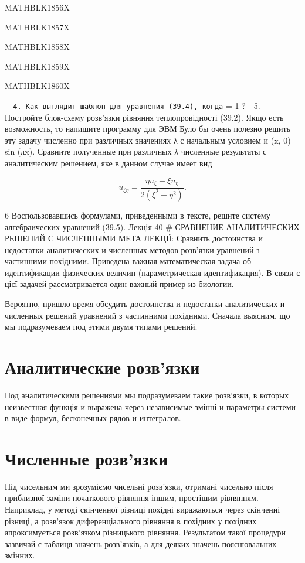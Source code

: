 \documentclass[
  ukrainian,
]{article}
\begin{document}
MATHBLK1856X

MATHBLK1857X

MATHBLK1858X

MATHBLK1859X

MATHBLK1860X

\texttt{-\ 4.\ Как\ выглядит\ шаблон\ для\ уравнения\ (39.4),\ когда}
\lambda = 1 ? - 5. Постройте блок-схему розв'язки рівняння
теплопровідності (39.2). Якщо есть возможность, то напишите программу
для ЭВМ Було бы очень полезно решить эту задачу численно при различных
значениях λ с начальным условием и (x, 0) = sin (πx). Сравните
полученные при различных λ численные результаты с аналитическим
решением, яке в данном случае имеет вид

\[
u_{\xi\eta} = \frac{\eta u_{\xi} - \xi u_{\eta}}{2(\xi^2 - \eta^2)}.
\]

6 Воспользовавшись формулами, приведенными в тексте, решите систему
алгебраических уравнений (39.5). Лекція 40 \# СРАВНЕНИЕ АНАЛИТИЧЕСКИХ
РЕШЕНИЙ С ЧИСЛЕННЫМИ МЕТА ЛЕКЦІЇ: Сравнить достоинства и недостатки
аналитических и численных методов розв'язки уравнений з частинними
похідними. Приведена важная математическая задача об идентификации
физических величин (параметрическая идентификация). В связи с цієї
задачей рассматривается один важный пример из биологии.

Вероятно, пришло время обсудить достоинства и недостатки аналитических и
численных решений уравнений з частинними похідними. Сначала выясним, що
мы подразумеваем под этими двумя типами решений.

\section{Аналитические
розв'язки}\label{ux430ux43dux430ux43bux438ux442ux438ux447ux435ux441ux43aux438ux435-ux440ux43eux437ux432ux44fux437ux43aux438}

Под аналитическими решениями мы подразумеваем такие розв'язки, в которых
неизвестная функція и выражена через независимые змінні и параметры
системи в виде формул, бесконечных рядов и интегралов.

\section{Численные
розв'язки}\label{ux447ux438ux441ux43bux435ux43dux43dux44bux435-ux440ux43eux437ux432ux44fux437ux43aux438}

Під чисельним ми зрозуміємо чисельні розв'язки, отримані чисельно після
приблизної заміни початкового рівняння іншим, простішим рівнянням.
Наприклад, у методі скінченної різниці похідні виражаються через
скінченні різниці, а розв'язок диференціального рівняння в похідних у
похідних апроксимується розв'язком різницького рівняння. Результатом
такої процедури зазвичай є таблиця значень розв'язків, а для деяких
значень пояснювальних змінних.
\end{document}
